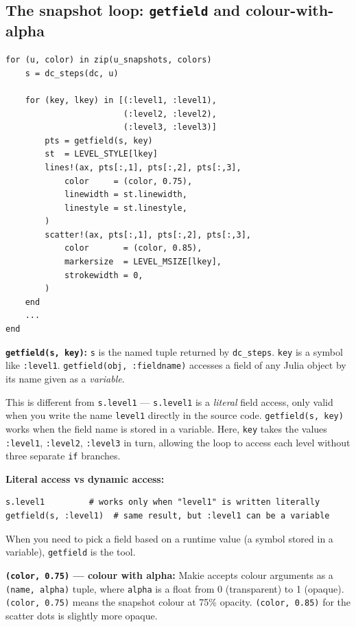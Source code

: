 \documentclass[12pt, a4paper]{article}
\newcommand{\cd}[1]{\texttt{#1}}
\begin{document}
\subsection{The snapshot loop: \texttt{getfield} and colour-with-alpha}

\begin{verbatim}
for (u, color) in zip(u_snapshots, colors)
    s = dc_steps(dc, u)

    for (key, lkey) in [(:level1, :level1),
                        (:level2, :level2),
                        (:level3, :level3)]
        pts = getfield(s, key)
        st  = LEVEL_STYLE[lkey]
        lines!(ax, pts[:,1], pts[:,2], pts[:,3],
            color     = (color, 0.75),
            linewidth = st.linewidth,
            linestyle = st.linestyle,
        )
        scatter!(ax, pts[:,1], pts[:,2], pts[:,3],
            color       = (color, 0.85),
            markersize  = LEVEL_MSIZE[lkey],
            strokewidth = 0,
        )
    end
    ...
end
\end{verbatim}

\textbf{\cd{getfield(s, key)}:}
\cd{s} is the named tuple returned by \cd{dc\_steps}.
\cd{key} is a symbol like \cd{:level1}.
\cd{getfield(obj, :fieldname)} accesses a field of any
Julia object by its name given as a \emph{variable}.

This is different from \cd{s.level1} ---
\cd{s.level1} is a \emph{literal} field access,
only valid when you write the name \cd{level1} directly
in the source code.
\cd{getfield(s, key)} works when the field name is stored
in a variable.
Here, \cd{key} takes the values \cd{:level1},
\cd{:level2}, \cd{:level3} in turn,
allowing the loop to access each level without three
separate \cd{if} branches.

\begin{notebox}
\textbf{Literal access vs dynamic access:}

\begin{verbatim}
s.level1         # works only when "level1" is written literally
getfield(s, :level1)  # same result, but :level1 can be a variable
\end{verbatim}

When you need to pick a field based on a runtime value
(a symbol stored in a variable), \cd{getfield} is the tool.
\end{notebox}

\textbf{\cd{(color, 0.75)} --- colour with alpha:}
Makie accepts colour arguments as a \cd{(name, alpha)} tuple,
where \cd{alpha} is a float from 0 (transparent) to 1 (opaque).
\cd{(color, 0.75)} means the snapshot colour at 75\% opacity.
\cd{(color, 0.85)} for the scatter dots is slightly more opaque.
\end{document}
